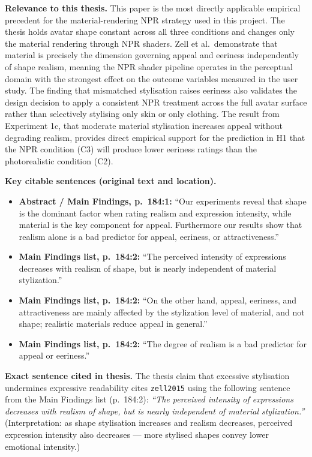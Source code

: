 \documentclass[11pt, a4paper]{article}
\begin{document}
\textbf{Relevance to this thesis.} This paper is the most directly applicable empirical precedent for the material-rendering NPR strategy used in this project. The thesis holds avatar shape constant across all three conditions and changes only the material rendering through NPR shaders. Zell et al.\ demonstrate that material is precisely the dimension governing appeal and eeriness independently of shape realism, meaning the NPR shader pipeline operates in the perceptual domain with the strongest effect on the outcome variables measured in the user study. The finding that mismatched stylisation raises eeriness also validates the design decision to apply a consistent NPR treatment across the full avatar surface rather than selectively stylising only skin or only clothing. The result from Experiment 1c, that moderate material stylisation increases appeal without degrading realism, provides direct empirical support for the prediction in H1 that the NPR condition (C3) will produce lower eeriness ratings than the photorealistic condition (C2).

\textbf{Key citable sentences (original text and location).}
\begin{itemize}[leftmargin=2em]
  \item \textbf{Abstract / Main Findings, p.\ 184:1:} ``Our experiments reveal that shape is the dominant factor when rating realism and expression intensity, while material is the key component for appeal. Furthermore our results show that realism alone is a bad predictor for appeal, eeriness, or attractiveness.''
  \item \textbf{Main Findings list, p.\ 184:2:} ``The perceived intensity of expressions decreases with realism of shape, but is nearly independent of material stylization.''
  \item \textbf{Main Findings list, p.\ 184:2:} ``On the other hand, appeal, eeriness, and attractiveness are mainly affected by the stylization level of material, and not shape; realistic materials reduce appeal in general.''
  \item \textbf{Main Findings list, p.\ 184:2:} ``The degree of realism is a bad predictor for appeal or eeriness.''
\end{itemize}

\textbf{Exact sentence cited in thesis.} The thesis claim that excessive stylisation undermines expressive readability cites \texttt{zell2015} using the following sentence from the Main Findings list (p.\ 184:2): \textit{``The perceived intensity of expressions decreases with realism of shape, but is nearly independent of material stylization.''} (Interpretation: as shape stylisation increases and realism decreases, perceived expression intensity also decreases --- more stylised shapes convey lower emotional intensity.)
\end{document}
